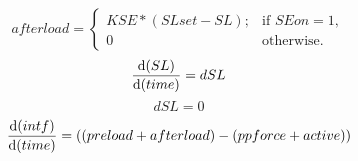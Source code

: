\documentclass[10pt,landscape]{article}
\begin{document}
\textbf{}
\begin{displaymath}afterload = 
\begin{cases}KSE \ast \left(SLset-SL\right);
        &  \text{if }SEon = 1,\\0&  \text{otherwise}.
\end{cases}
\end{displaymath}
\textbf{}
\begin{displaymath}\frac{\mathrm{d}(SL)}{\mathrm{d}(time)} = dSL
\end{displaymath}
\textbf{}
\begin{displaymath}dSL = 0
\end{displaymath}
\textbf{}
\begin{displaymath}\frac{\mathrm{d}(intf)}{\mathrm{d}(time)} = \left(\left(preload+afterload\right)-\left(ppforce+active\right)\right)
\end{displaymath}
\end{document}
